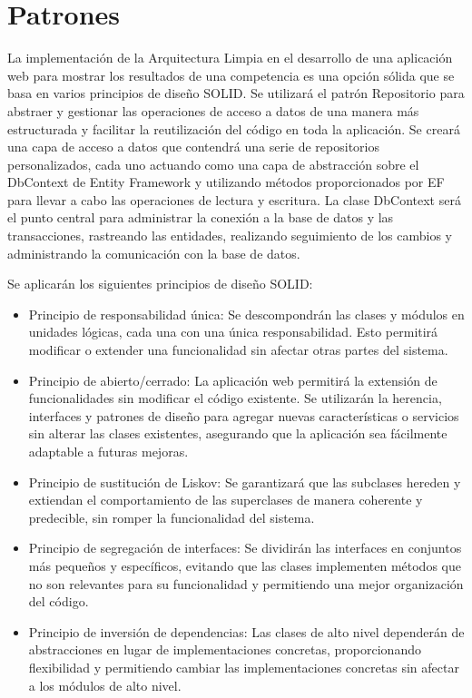 \documentclass{article} %
\begin{document}
\section{Patrones}
La implementación de la Arquitectura Limpia en el desarrollo de una aplicación web para mostrar los resultados de una competencia es una opción sólida que se basa en varios principios de diseño SOLID. Se utilizará el patrón Repositorio para abstraer y gestionar las operaciones de acceso a datos de una manera más estructurada y facilitar la reutilización del código en toda la aplicación. Se creará una capa de acceso a datos que contendrá una serie de repositorios personalizados, cada uno actuando como una capa de abstracción sobre el DbContext de Entity Framework y utilizando métodos proporcionados por EF para llevar a cabo las operaciones de lectura y escritura. La clase DbContext será el punto central para administrar la conexión a la base de datos y las transacciones, rastreando las entidades, realizando seguimiento de los cambios y administrando la comunicación con la base de datos.

Se aplicarán los siguientes principios de diseño SOLID:

\begin{itemize}
    \item Principio de responsabilidad única: Se descompondrán las clases y módulos en unidades lógicas, cada una con una única responsabilidad. Esto permitirá modificar o extender una funcionalidad sin afectar otras partes del sistema.
    \item Principio de abierto/cerrado: La aplicación web permitirá la extensión de funcionalidades sin modificar el código existente. Se utilizarán la herencia, interfaces y patrones de diseño para agregar nuevas características o servicios sin alterar las clases existentes, asegurando que la aplicación sea fácilmente adaptable a futuras mejoras.
    \item Principio de sustitución de Liskov: Se garantizará que las subclases hereden y extiendan el comportamiento de las superclases de manera coherente y predecible, sin romper la funcionalidad del sistema.
    \item Principio de segregación de interfaces: Se dividirán las interfaces en conjuntos más pequeños y específicos, evitando que las clases implementen métodos que no son relevantes para su funcionalidad y permitiendo una mejor organización del código.
    \item Principio de inversión de dependencias: Las clases de alto nivel dependerán de abstracciones en lugar de implementaciones concretas, proporcionando flexibilidad y permitiendo cambiar las implementaciones concretas sin afectar a los módulos de alto nivel.
\end{itemize}
\end{document}

